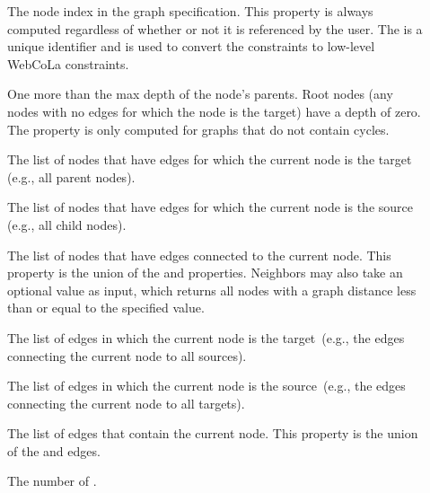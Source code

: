 \begin{description}
\item[] The node index in the graph specification. This
  property is always computed regardless of whether or not it is referenced by the user. The
   is a unique identifier and is used to 
  convert the \projectname constraints to low-level WebCoLa constraints.
\item[] One more than the max depth of the node's parents. 
	Root nodes (any nodes with no edges for which the node is the target)
	have a depth of zero. The  property is only computed for
	graphs that do not contain cycles.
\item[] The list of nodes that have edges for which the
	current node is the target (e.g., all parent nodes).
\item[] The list of nodes that have edges for which the
	current node is the source (e.g., all child nodes).
\item[] The list of nodes that have edges connected to
  the current node. This property is the union of the  and
   properties. Neighbors may also take an optional value
  as input, which returns all nodes with a graph distance less than or
  equal to the specified value.
\item[] The list of edges in which the current node is the
	target~(e.g., the edges connecting the current node to all sources).
\item[] The list of edges in which the current node is the
	source~(e.g., the edges connecting the current node to all targets).
\item[] The list of edges that contain the current node. This
	property is the union of the  and  edges.
\item[] The number of .
\end{description}
\constraintsFigure



